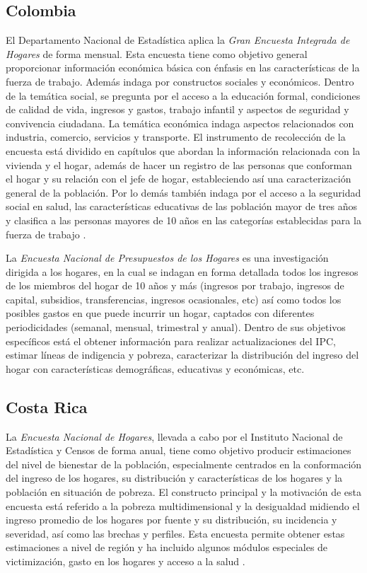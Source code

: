 \documentclass[
  12pt,
]{book}
\begin{document}
\hypertarget{colombia}{%
\subsection{Colombia}\label{colombia}}

El Departamento Nacional de Estadística aplica la \emph{Gran Encuesta Integrada de Hogares} de forma mensual. Esta encuesta tiene como objetivo general proporcionar información económica básica con énfasis en las características de la fuerza de trabajo. Además indaga por constructos sociales y económicos. Dentro de la temática social, se pregunta por el acceso a la educación formal, condiciones de calidad de vida, ingresos y gastos, trabajo infantil y aspectos de seguridad y convivencia ciudadana. La temática económica indaga aspectos relacionados con industria, comercio, servicios y transporte. El instrumento de recolección de la encuesta está dividido en capítulos que abordan la información relacionada con la vivienda y el hogar, además de hacer un registro de las personas que conforman el hogar y su relación con el jefe de hogar, estableciendo así una caracterización general de la población. Por lo demás también indaga por el acceso a la seguridad social en salud, las características educativas de las población mayor de tres años y clasifica a las personas mayores de 10 años en las categorías establecidas para la fuerza de trabajo \citep{DANE-COL_2017}.

La \emph{Encuesta Nacional de Presupuestos de los Hogares} es una investigación dirigida a los hogares, en la cual se indagan en forma detallada todos los ingresos de los miembros del hogar de 10 años y más (ingresos por trabajo, ingresos de capital, subsidios, transferencias, ingresos ocasionales, etc) así como todos los posibles gastos en que puede incurrir un hogar, captados con diferentes periodicidades (semanal, mensual, trimestral y anual). Dentro de sus objetivos específicos está el obtener información para realizar actualizaciones del IPC, estimar líneas de indigencia y pobreza, caracterizar la distribución del ingreso del hogar con características demográficas, educativas y económicas, etc. \citep{DANE-COL_2018}

\hypertarget{costa-rica}{%
\subsection{Costa Rica}\label{costa-rica}}

La \emph{Encuesta Nacional de Hogares}, llevada a cabo por el Instituto Nacional de Estadística y Censos de forma anual, tiene como objetivo producir estimaciones del nivel de bienestar de la población, especialmente centrados en la conformación del ingreso de los hogares, su distribución y características de los hogares y la población en situación de pobreza. El constructo principal y la motivación de esta encuesta está referido a la pobreza multidimensional y la desigualdad midiendo el ingreso promedio de los hogares por fuente y su distribución, su incidencia y severidad, así como las brechas y perfiles. Esta encuesta permite obtener estas estimaciones a nivel de región y ha incluido algunos módulos especiales de victimización, gasto en los hogares y acceso a la salud \citep{INEC-CR_2017}.
\end{document}
